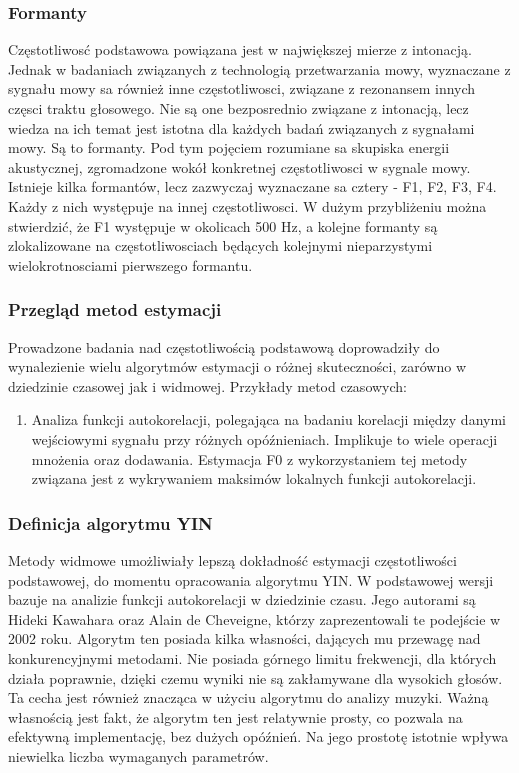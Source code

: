 \documentclass[a4paper,12 pt]{article}
\begin{document}
\subsubsection{Formanty}
Częstotliwosć podstawowa powiązana jest w największej mierze z intonacją. Jednak w badaniach związanych z technologią przetwarzania mowy, wyznaczane z sygnału mowy sa również inne częstotliwosci, związane z rezonansem innych częsci traktu głosowego. Nie są one bezposrednio związane z intonacją, lecz wiedza na ich temat jest istotna dla każdych badań związanych z sygnałami mowy. Są to formanty. Pod tym pojęciem rozumiane sa skupiska energii akustycznej, zgromadzone wokół konkretnej częstotliwosci w sygnale mowy. Istnieje kilka formantów, lecz zazwyczaj wyznaczane sa cztery - F1, F2, F3, F4. Każdy z nich występuje na innej częstotliwosci. W dużym przybliżeniu można stwierdzić, że F1 występuje w okolicach 500 Hz, a kolejne formanty są zlokalizowane na częstotliwosciach będących kolejnymi nieparzystymi wielokrotnosciami pierwszego formantu.
\subsubsection{Przegląd metod estymacji}
Prowadzone badania nad częstotliwością podstawową doprowadziły do wynalezienie wielu algorytmów estymacji o różnej skuteczności, zarówno w dziedzinie czasowej jak i widmowej.
Przykłady metod czasowych:
\begin{enumerate}
\item Analiza funkcji autokorelacji, polegająca na badaniu korelacji między danymi wejściowymi sygnału przy różnych opóźnieniach. Implikuje to wiele operacji mnożenia oraz dodawania. Estymacja F0 z wykorzystaniem tej metody związana jest z wykrywaniem maksimów lokalnych funkcji autokorelacji.
 
\end{enumerate}
 




\subsubsection{Definicja algorytmu YIN}

Metody widmowe umożliwiały lepszą dokładność estymacji częstotliwości podstawowej, do momentu opracowania algorytmu YIN. W podstawowej wersji bazuje na analizie funkcji autokorelacji w dziedzinie czasu. Jego autorami są Hideki Kawahara oraz Alain de Cheveigne, którzy zaprezentowali te podejście w 2002 roku. Algorytm ten posiada kilka własności, dających mu przewagę nad konkurencyjnymi metodami. Nie posiada górnego limitu frekwencji, dla których działa poprawnie, dzięki czemu wyniki nie są zakłamywane dla wysokich głosów. Ta cecha jest również znacząca w użyciu algorytmu do analizy muzyki. Ważną własnością jest fakt, że algorytm ten jest relatywnie prosty, co pozwala na efektywną implementację, bez dużych opóźnień. Na jego prostotę istotnie wpływa niewielka liczba wymaganych parametrów.
\end{document}
